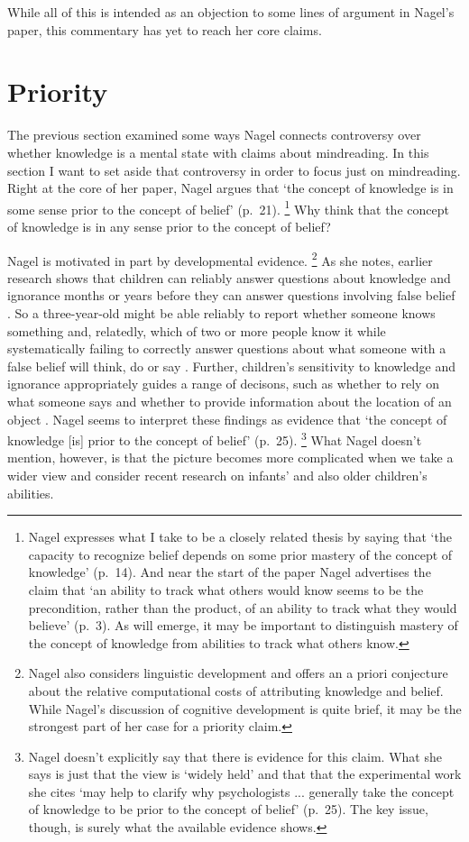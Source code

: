 \documentclass[11pt,a4paper]{extarticle}
\begin{document}
While all of this is intended as an objection to some lines of argument in Nagel's paper, this commentary has yet to reach her core claims.




\section{Priority}
The previous section examined some ways  Nagel connects  controversy over whether knowledge is a mental state with claims about mindreading.
In this section I want to set aside that controversy in order to focus just on mindreading.
Right at the core of her paper, Nagel argues that  `the concept of knowledge is in some sense prior to the concept of belief' (p.\ 21).%
\footnote{
Nagel expresses what I take to be a closely related thesis by saying that `the capacity to recognize belief depends on some prior mastery of the concept of knowledge' (p.\ 14).
And near the start of the paper Nagel advertises the claim that `an ability to track what others would know seems to be the precondition, rather than the product, of an ability to track what they would believe' (p.\ 3).
As will emerge,
it may be important to distinguish mastery of the concept of knowledge from abilities to track what others know.
}
Why think that the concept of knowledge is in any sense prior to the concept of belief?

Nagel is motivated in part by developmental evidence.%
\footnote{
Nagel also considers linguistic development and offers an a priori conjecture about the relative computational costs of attributing knowledge and belief.
While Nagel's discussion of cognitive development is quite brief, it may be the strongest part of her case for a priority claim.
}
As she notes, earlier research shows that
children can reliably answer questions about knowledge and ignorance months or years before they can answer questions involving false belief \citep{hogrefe_ignorance_1986}.
So a three-year-old might be able reliably to report whether someone knows something and, relatedly, which of two or more people know it while systematically failing to correctly answer questions about what someone with a false belief will think, do or say \citep{Wellman:2001lz}.
Further, children's sensitivity to knowledge and ignorance appropriately guides a range of decisons, 
such as whether to rely on what someone says \citep{Robinson:1999sq,Robinson:2003bh} 
and whether to provide information about the location of an object \citep{Dunham:2000tv,Liszkowski:2008al}.
Nagel seems to interpret these findings as evidence that `the concept of knowledge [is] prior to the concept of belief' (p.\ 25).%
\footnote{
Nagel doesn't explicitly say that there is evidence for this claim.
What she says is just that the view is `widely held' and that that the experimental work she cites `may help to clarify why psychologists ... generally take the concept of knowledge to be prior to the concept of belief' (p.\ 25).
The key issue, though, is surely what the available evidence shows.
} 
What Nagel doesn't mention, however, is that the picture becomes more complicated when we take a wider view and consider recent research on infants' and also older children's abilities.
\end{document}

